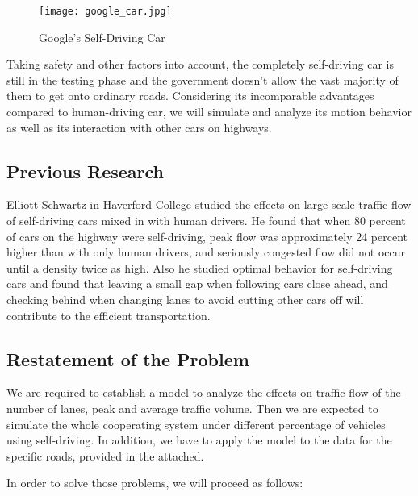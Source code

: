 \documentclass{mcmthesis}
\numberwithin{equation}{section}
\begin{document}
			\begin{figure}[H]
				\begin{center}
					\texttt{[image: google\_car.jpg]}
					\caption{Google's Self-Driving Car}
				\end{center}
			\end{figure}

			Taking safety and other factors into account, the completely self-driving car is still in the testing phase and the government doesn't allow the vast majority of them to get onto ordinary roads. Considering its 	incomparable advantages compared to human-driving car, we will simulate and analyze its motion behavior as well as its interaction with other cars on highways.

		\subsection{Previous Research}
			Elliott Schwartz in Haverford College studied the effects on large-scale traffic flow of self-driving cars mixed in with human drivers. He found that when 80 percent of cars on the highway were self-driving, peak flow was approximately 24 percent higher than with only human drivers, and seriously congested flow did not occur until a density twice as high. Also he studied optimal behavior for self-driving cars and found that leaving a small gap when following cars close ahead, and checking behind when changing lanes to avoid cutting other cars off will contribute to the efficient transportation.

		\subsection{Restatement of the Problem}
			We are required to establish a model to analyze the effects on traffic flow of the number of lanes, peak and average traffic volume. Then we are expected to simulate the whole cooperating system under different percentage of vehicles using self-driving. In addition, we have to apply the model to the data for the specific roads, provided in the attached.

			In order to solve those problems, we will proceed as follows:
\end{document}
